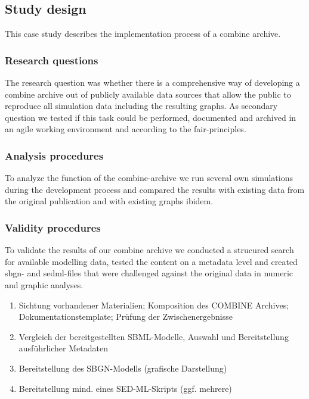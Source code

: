 \subsection*{Study design}
This case study describes the implementation process of a \ac{combine} archive.
\subsubsection*{Research questions}
The research question was whether there is a comprehensive way of developing a \ac{combine} archive out of publicly available data sources that allow the public to reproduce all simulation data including the resulting graphs. As secondary question we tested if this task could be performed, documented and archived in an agile working environment and according to the \acs{fair}-principles.
\subsubsection*{Analysis procedures}
To analyze the function of the \ac{combine}-archive we run several own simulations during the development process and compared the results with existing data from the original publication and with existing graphs ibidem.
\subsubsection*{Validity procedures}
To validate the results of our \ac{combine} archive we conducted a strucured search for available modelling data, tested the content on a metadata level and created \ac{sbgn}- and \ac{sedml}-files that were challenged against the original data in numeric and graphic analyses.

\begin{enumerate}
    \item Sichtung vorhandener Materialien; Komposition des COMBINE Archives; Dokumentationstemplate; Prüfung der Zwischenergebnisse
    \item Vergleich der bereitgestellten SBML-Modelle, Auswahl und Bereitstellung ausführlicher Metadaten
    \item Bereitstellung des SBGN-Modells (grafische Darstellung) 
    \item Bereitstellung mind. eines SED-ML-Skripts (ggf. mehrere)
\end{enumerate}

